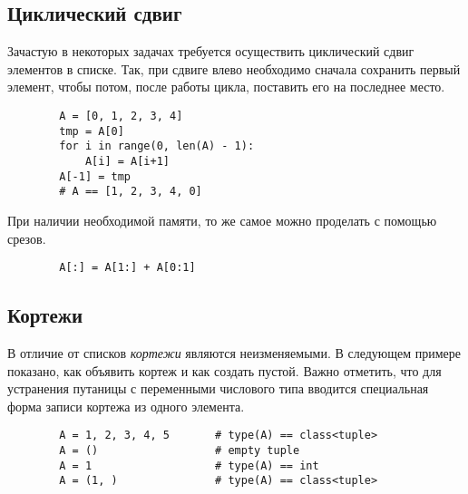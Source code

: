 \documentclass[a4paper, fleqn]{article}
\begin{document}
	\subsection*{Циклический сдвиг}
	
	Зачастую в некоторых задачах требуется осуществить циклический сдвиг элементов в списке. Так, при сдвиге влево необходимо  сначала сохранить первый элемент, чтобы потом, после работы цикла, поставить его на последнее место.
	\begin{lstlisting}
		A = [0, 1, 2, 3, 4]
		tmp = A[0]
		for i in range(0, len(A) - 1):
			A[i] = A[i+1]
		A[-1] = tmp
		# A == [1, 2, 3, 4, 0]
	\end{lstlisting}
	При наличии необходимой памяти, то же самое можно проделать с помощью срезов.
	\begin{lstlisting}
		A[:] = A[1:] + A[0:1]
	\end{lstlisting}
	
	\subsection*{Кортежи}
	
	В отличие от списков \emph{кортежи} являются неизменяемыми. В следующем примере показано, как объявить кортеж и как создать пустой. Важно отметить, что для устранения путаницы с переменными числового типа вводится специальная форма записи кортежа из одного элемента.
	\begin{lstlisting}
		A = 1, 2, 3, 4, 5		# type(A) == class<tuple>
		A = ()					# empty tuple
		A = 1					# type(A) == int
		A = (1, )				# type(A) == class<tuple>
	\end{lstlisting}
	
	
\end{document}
